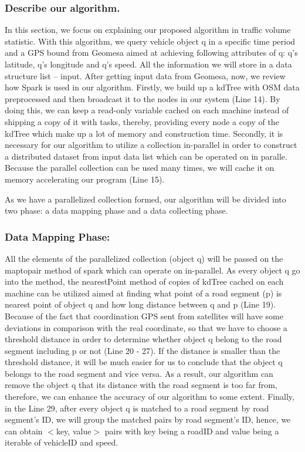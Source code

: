 \documentclass{acm_proc_article-sp}
\begin{document}
	\subsubsection{Describe our algorithm.}
		
	\setlength{\parindent}{0.7cm} In this section, we focus on explaining our proposed algorithm in traffic volume statistic. With this algorithm, we query vehicle object q in a specific time period and a GPS bound from Geomesa aimed at achieving following attributes of q: q's latitude, q's longitude and q's speed. All the information we will store in a data structure list – input. After getting input data from Geomesa, now, we review how Spark is used in our algorithm. Firstly, we build up a kdTree with OSM data preprocessed and then broadcast it to the nodes in our system (Line 14). By doing this, we can keep a read-only variable cached on each machine instead of shipping a copy of it with tasks, thereby, providing every node a copy of the kdTree which make up a lot of memory and construction time. Secondly, it is necessary for our algorithm to utilize a collection in-parallel in order to construct a distributed dataset from input data list which can be operated on in paralle. Because the parallel collection can be used many times, we will cache it on memory accelerating our program (Line 15).
	
\setlength{\parindent}{0.7cm} As we have a parallelized collection formed, our algorithm will be divided into two phase: a data mapping phase and a data collecting phase. 

\subsubsection{Data Mapping Phase:} All the elements of the parallelized collection (object q) will be passed on the maptopair method of spark which can operate on in-parallel. As every object q go into the method, the nearestPoint method of copies of kdTree cached on each machine can be utilized aimed at finding what point of a road segment (p) is nearest point of object q and how long distance between q and p (Line 19). Because of the fact that coordination GPS sent from satellites will have some deviations in comparison with the real coordinate, so that we have to choose a threshold distance in order to determine whether object q belong to the road segment including p or not (Line 20 - 27). If the distance is smaller than the threshold distance, it will be much easier for us to conclude that the object q belongs to the road segment and vice versa. As a result, our algorithm can remove the object q that its distance with the road segment is too far from, therefore, we can enhance the accuracy of our algorithm to some extent. Finally, in the Line 29, after every object q is matched to a road segment by road segment's ID, we will group the matched pairs by road segment's ID, hence, we can obtain $<$key, value$>$ pairs with key being a roadID and value being a iterable of vehicleID and speed.
\end{document}
